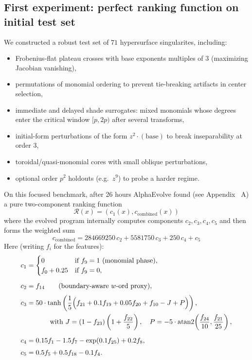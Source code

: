 \documentclass[11pt]{amsart}
\begin{document}
\subsection{First experiment: perfect ranking function on initial test set} \label{subsec:experiment1}
We constructed a robust test set of $71$ hypersurface singularites, including:
\begin{itemize}[leftmargin=2em]
\item Frobenius-flat plateau crosses with base exponents multiples of $3$ (maximizing Jacobian vanishing),
\item permutations of monomial ordering to prevent tie-breaking artifacts in center selection,
\item immediate and delayed shade surrogates: mixed monomials whose degrees enter the critical window $[p,2p)$ after several transforms,
\item initial-form perturbations of the form $z^2\cdot(\text{base})$ to break inseparability at order $3$,
\item toroidal/quasi-monomial cores with small oblique perturbations,
\item optional order $p^2$ holdouts (e.g.\ $z^9$) to probe a harder regime.
\end{itemize}

On this focused benchmark, after 26 hours AlphaEvolve found (see Appendix ~A) a pure two-component ranking function 
\[
\mathcal{R}(x) = (c_1(x), c_{\mathrm{combined}}(x))
\]
where the evolved program internally computes components $c_2,c_3,c_4,c_5$ and then forms the weighted sum
\[
c_{\mathrm{combined}}
=
284669250\,c_2
+
5581750\,c_3
+
250\,c_4
+
c_5
\]
Here (writing $f_i$ for the features):
\begin{align*}
c_1 &= 
\begin{cases}
0 & \text{if } f_9 = 1\ \text{(monomial phase)},\\
f_0 + 0.25 & \text{if } f_9 = 0,
\end{cases}
\\[2mm]
c_2 &= f_{14} \qquad\text{(boundary-aware } w\text{-ord proxy)},\\[1mm]
c_3 &= 50\cdot \tanh \left(\frac{1}{5}\Big(f_{21} + 0.1 f_{19} + 0.05 f_{20} + f_{10} - J + P\Big)\right),\\
&\hspace{1.2cm}\text{with }J=(1-f_{23})\left(1+\frac{f_{22}}{5}\right),\quad
P=-5\cdot \operatorname{atan2}\!\left(\frac{f_{24}}{10},\frac{f_{21}}{25}\right),\\[2mm]
c_4 &= 0.15 f_1 - 1.5 f_7 - \exp(0.1 f_{25}) + 0.2 f_8,\\[1mm]
c_5 &= 0.5 f_5 + 0.5 f_{18} - 0.1 f_4.
\end{align*}
\end{document}
